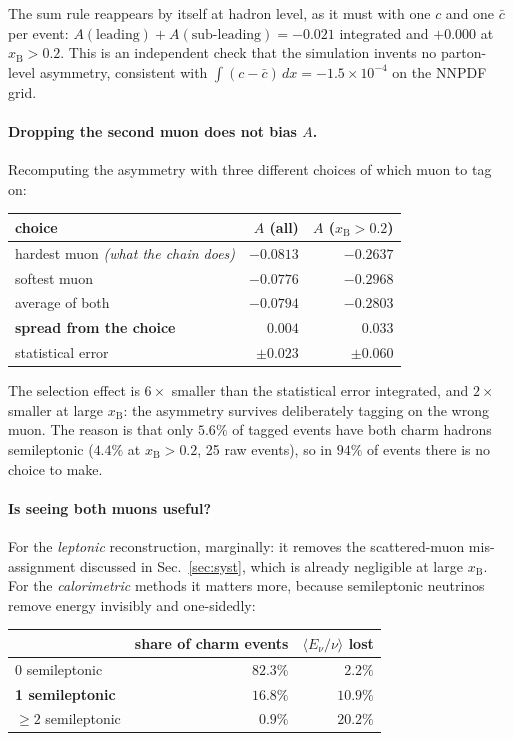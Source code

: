\documentclass[11pt,a4paper]{article}
\newcommand{\xB}{x_{\mathrm{B}}}
\begin{document}
The sum rule reappears by itself at hadron level, as it must with one $c$ and one
$\bar{c}$ per event: $A(\text{leading})+A(\text{sub-leading}) = -0.021$
integrated and $+0.000$ at $\xB>0.2$. This is an independent check that the
simulation invents no parton-level asymmetry, consistent with
$\int(c-\bar{c})\,dx = -1.5\times10^{-4}$ on the NNPDF grid.

\paragraph{Dropping the second muon does not bias $A$.} Recomputing the
asymmetry with three different choices of which muon to tag on:

\begin{center}\small
\begin{tabular}{lrr}
\toprule
choice & $A$ (all) & $A$ ($\xB>0.2$) \\
\midrule
hardest muon \emph{(what the chain does)} & $-0.0813$ & $-0.2637$ \\
softest muon & $-0.0776$ & $-0.2968$ \\
average of both & $-0.0794$ & $-0.2803$ \\
\midrule
\textbf{spread from the choice} & $\mathbf{0.004}$ & $\mathbf{0.033}$ \\
statistical error & $\pm0.023$ & $\pm0.060$ \\
\bottomrule
\end{tabular}
\end{center}

\noindent
The selection effect is $6\times$ smaller than the statistical error integrated,
and $2\times$ smaller at large $\xB$: the asymmetry survives deliberately tagging
on the wrong muon. The reason is that only $5.6\%$ of tagged events have both
charm hadrons semileptonic ($4.4\%$ at $\xB>0.2$, 25 raw events), so in $94\%$ of
events there is no choice to make.

\paragraph{Is seeing both muons useful?} For the \emph{leptonic} reconstruction,
marginally: it removes the scattered-muon mis-assignment discussed in
Sec.~\ref{sec:syst}, which is already negligible at large $\xB$. For the
\emph{calorimetric} methods it matters more, because semileptonic neutrinos
remove energy invisibly and one-sidedly:

\begin{center}\small
\begin{tabular}{lrr}
\toprule
 & share of charm events & $\langle E_\nu/\nu\rangle$ lost \\
\midrule
0 semileptonic & $82.3\%$ & $2.2\%$ \\
\textbf{1 semileptonic} & $16.8\%$ & $\mathbf{10.9\%}$ \\
$\geq2$ semileptonic & $0.9\%$ & $20.2\%$ \\
\bottomrule
\end{tabular}
\end{center}
\end{document}
